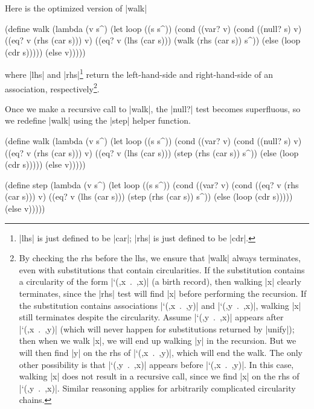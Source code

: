 Here is the optimized version of \mbox{\scheme|walk|}

\schemedisplayspace
\begin{schemedisplay}
(define walk
  (lambda (v s^)
    (let loop ((s s^))
      (cond
        ((var? v)
         (cond
           ((null? s) v)
           ((eq? v (rhs (car s))) v)
           ((eq? v (lhs (car s))) (walk (rhs (car s)) s^))
           (else (loop (cdr s)))))
        (else v)))))
\end{schemedisplay}

\noindent where \scheme|lhs| and \scheme|rhs|\footnote{\scheme|lhs| is
just defined to be \scheme|car|; \scheme|rhs| is just defined to be
\scheme|cdr|.} return the left-hand-side and right-hand-side of an
association, respectively\footnote{By checking the rhs before
the lhs, we ensure that \scheme|walk| always terminates, even
with substitutions that contain circularities.  If the substitution
contains a circularity of the form \mbox{\scheme|`(,x . ,x)|} (a birth
record), then walking \scheme|x| clearly terminates, since the
\scheme|rhs| test will find \scheme|x| before performing the
recursion.  If the substitution contains associations 
\mbox{\scheme|`(,x . ,y)|} and \mbox{\scheme|`(,y . ,x)|},
walking \scheme|x| still terminates despite the circularity.
Assume \mbox{\scheme|`(,y . ,x)|} appears after 
\mbox{\scheme|`(,x . ,y)|}
(which will never happen for substitutions returned by
\scheme|unify|); then when we walk \scheme|x|, we will end up walking
\scheme|y| in the recursion.  But we will then find \scheme|y| on the
rhs of \mbox{\scheme|`(,x . ,y)|}, which will end the walk.  The
only other possibility is that \mbox{\scheme|`(,y . ,x)|} appears before \mbox{\scheme|`(,x . ,y)|}.  In this case, walking \scheme|x| does not
result in a recursive call, since we find \scheme|x| on the
rhs of \mbox{\scheme|`(,y . ,x)|}.  Similar reasoning applies for
arbitrarily complicated circularity chains.}.

Once we make a recursive call to \scheme|walk|, the
\scheme|null?| test becomes superfluous, so we
redefine \scheme|walk| using the \scheme|step| helper function.

\schemedisplayspace
\begin{schemedisplay}
(define walk
  (lambda (v s^)
    (let loop ((s s^))
      (cond
        ((var? v)
         (cond
           ((null? s) v)
           ((eq? v (rhs (car s))) v)
           ((eq? v (lhs (car s))) (step (rhs (car s)) s^))
           (else (loop (cdr s)))))
        (else v)))))
\end{schemedisplay}
\newpage
\begin{schemedisplay}
(define step
  (lambda (v s^)
    (let loop ((s s^))
      (cond
        ((var? v)
         (cond
           ((eq? v (rhs (car s))) v)
           ((eq? v (lhs (car s))) (step (rhs (car s)) s^))
           (else (loop (cdr s)))))
        (else v)))))
\end{schemedisplay}


